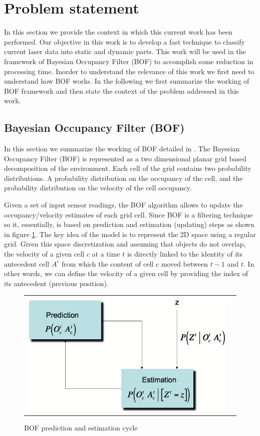
\section{Problem statement}
In this section we provide the context in which this current work has been performed. Our objective in this work is to develop a fast technique to classify current laser data into static and dynamic parts. This work will be used in the framework of Bayesian Occupancy Filter (BOF)\cite{coue:inria-00182004, mekhnacha:inria-00336356} to accomplish some reduction in processing time. Inorder to understand the relevance of this work we first need to understand how BOF works. In the following we first summarize the working of BOF framework and then state the context of the problem addressed in this work.
\subsection{Bayesian Occupancy Filter (BOF)}
In this section we summarize the working of BOF detailed in \cite{mekhnacha:inria-00336356}. The Bayesian Occupancy Filter (BOF) is represented as a two dimensional planar grid based decomposition of the environment. Each cell of the grid contains two probability distributions. A probability distribution on the occupancy of the cell, and the probability distribution on the velocity of the cell occupancy.

Given a set of input sensor readings, the BOF algorithm allows to update the occupancy/velocity estimates of each grid cell. Since BOF is a filtering technique so it, essentially, is based on prediction and estimation (updating) steps as shown in figure \ref{fig:bf}. The key idea of the model is to represent the 2D space using a regular grid. Given this space discretization and assuming that objects do not overlap, the velocity of a given cell $c$ at a time $t$ is directly linked to the identity of its antecedent cell $A^c$ from which the content of cell $c$ moved between $t-1$ and $t$. In other words, we can define the velocity of a given cell by providing the index of its antecedent (previous position).

\begin{figure}[H]
   \centering
     \begin{tabular}{lr}
       \includegraphics[scale=0.5]{img/fig:bf}
     \end{tabular}
   \caption{BOF prediction and estimation cycle}
   \label{fig:bf}
\end{figure}

